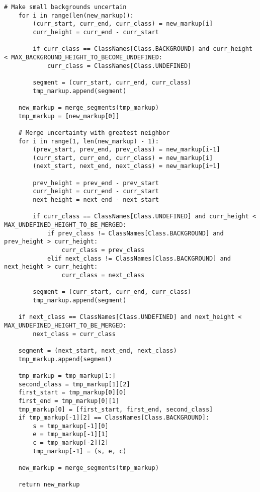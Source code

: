 \begin{lstlisting}[caption={Функция создания объединенной разметки}, label={lst:merged}]
    # Make small backgrounds uncertain
    for i in range(len(new_markup)):
        (curr_start, curr_end, curr_class) = new_markup[i]
        curr_height = curr_end - curr_start

        if curr_class == ClassNames[Class.BACKGROUND] and curr_height < MAX_BACKGROUND_HEIGHT_TO_BECOME_UNDEFINED:
            curr_class = ClassNames[Class.UNDEFINED]

        segment = (curr_start, curr_end, curr_class)
        tmp_markup.append(segment)

    new_markup = merge_segments(tmp_markup)
    tmp_markup = [new_markup[0]]

    # Merge uncertainty with greatest neighbor
    for i in range(1, len(new_markup) - 1):
        (prev_start, prev_end, prev_class) = new_markup[i-1]
        (curr_start, curr_end, curr_class) = new_markup[i]
        (next_start, next_end, next_class) = new_markup[i+1]

        prev_height = prev_end - prev_start
        curr_height = curr_end - curr_start
        next_height = next_end - next_start

        if curr_class == ClassNames[Class.UNDEFINED] and curr_height < MAX_UNDEFINED_HEIGHT_TO_BE_MERGED:
            if prev_class != ClassNames[Class.BACKGROUND] and prev_height > curr_height:
                curr_class = prev_class
            elif next_class != ClassNames[Class.BACKGROUND] and next_height > curr_height:
                curr_class = next_class

        segment = (curr_start, curr_end, curr_class)
        tmp_markup.append(segment)

    if next_class == ClassNames[Class.UNDEFINED] and next_height < MAX_UNDEFINED_HEIGHT_TO_BE_MERGED:
        next_class = curr_class

    segment = (next_start, next_end, next_class)
    tmp_markup.append(segment)

    tmp_markup = tmp_markup[1:]
    second_class = tmp_markup[1][2]
    first_start = tmp_markup[0][0]
    first_end = tmp_markup[0][1]
    tmp_markup[0] = [first_start, first_end, second_class]
    if tmp_markup[-1][2] == ClassNames[Class.BACKGROUND]:
        s = tmp_markup[-1][0]
        e = tmp_markup[-1][1]
        c = tmp_markup[-2][2]
        tmp_markup[-1] = (s, e, c)

    new_markup = merge_segments(tmp_markup)

    return new_markup
\end{lstlisting}

